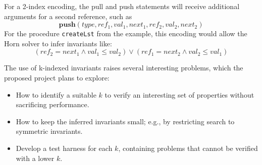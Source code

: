 For a 2-index encoding, the pull and push statements will receive additional
arguments for a second reference, such as
\[
\textbf{push}(type,ref_1, val_1, next_1, ref_2, val_2, next_2)
\]
For the procedure \texttt{createLst} from the example, this encoding would allow the
 Horn solver to infer invariants like:
 \[
 (ref_2=next_1 \wedge val_1\leq val_2)
 \vee (ref_1=next_2 \wedge val_2\leq val_1)
 \]

The use of k-indexed invariants raises several interesting problems, which
the proposed project plans to explore:
\begin{itemize}
\item How to identify a suitable $k$ to verify an interesting set of 
properties without sacrificing performance.
\item How to keep the inferred invariants small; e.g., by restricting search
to symmetric invariants.
\item Develop a test harness for each $k$, containing problems that cannot
be verified with a lower $k$.
\end{itemize}




